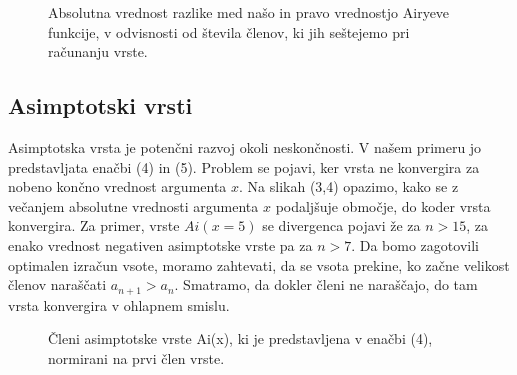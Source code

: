 \documentclass[11pt]{article}
\begin{document}
\begin{figure}[h!]	 %
\begin{center}


\end{center}
\caption{Absolutna vrednost razlike med našo in pravo vrednostjo Airyeve funkcije, v odvisnosti od števila členov, ki jih seštejemo pri računanju vrste.}
\end{figure}







\subsection{Asimptotski vrsti}

Asimptotska vrsta je potenčni razvoj okoli neskončnosti. V našem primeru jo predstavljata enačbi (4) in (5). Problem se pojavi, ker vrsta ne konvergira za nobeno končno vrednost argumenta $x$. Na slikah (3,4) opazimo, kako se z večanjem absolutne vrednosti  argumenta $x$ podaljšuje območje, do koder vrsta konvergira. Za primer, vrste $Ai(x=5)$  se divergenca pojavi že za $n>15$, za enako vrednost negativen asimptotske vrste pa za $n>7$. Da bomo zagotovili optimalen izračun vsote, moramo zahtevati, da se vsota prekine, ko začne velikost členov naraščati $a_{n+1} > a_{n}$. Smatramo, da dokler členi ne naraščajo, do tam vrsta konvergira v ohlapnem smislu.

\begin{figure}[h!]	 %
\begin{center}


\end{center}
\caption{Členi asimptotske vrste Ai(x), ki je predstavljena v enačbi (4), normirani na prvi člen vrste.}
\end{figure}
	
\end{document}
